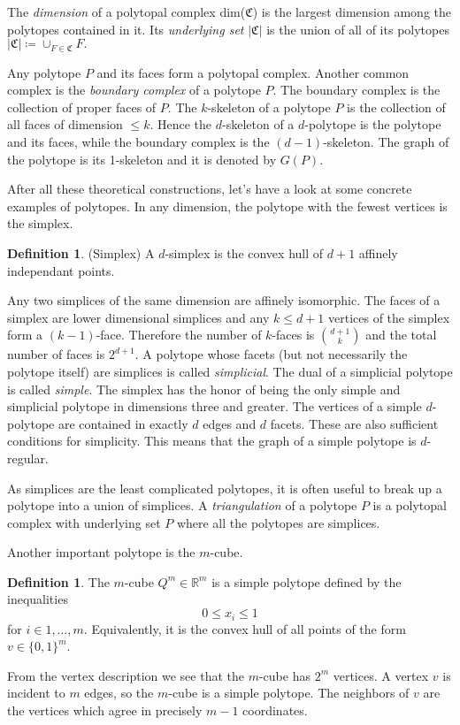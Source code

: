\documentclass[a4paper,12pt]{book}
\theoremstyle{plain}
\theoremstyle{definition}
\newtheorem{definition}[theorem]{Definition}
\begin{document}
The \emph{dimension} of a polytopal complex dim($\mathfrak{C}$) is the largest dimension
among the polytopes contained in it. Its \textit{underlying set} $|\mathfrak{C}|$ is the union of all of 
its polytopes $  |\mathfrak{C}| \coloneqq \cup_{F\in \mathfrak{C}} F.$

Any polytope $P$ and its faces form a polytopal complex. Another common complex is the 
\textit{boundary complex} of a polytope
$P$. The boundary complex is the collection of proper faces of $P$.
The $k$-skeleton of a polytope $P$ is the collection of all faces of dimension $\leq 
k$. Hence the $d$-skeleton of a $d$-polytope is the polytope and its faces, while the 
boundary complex is the $(d-1)$-skeleton. The graph of the polytope is its 
1-skeleton and it is denoted by $G(P)$.

After all these theoretical constructions, let's have a look at some concrete examples
of polytopes.
In any dimension, the polytope with the fewest vertices is the simplex. 
\begin{definition}
 (Simplex) A $d$-simplex is the convex hull of $d+1$ affinely independant 
points.
\end{definition}
Any two simplices of the same dimension are affinely isomorphic.
The faces of a simplex are lower dimensional simplices and any $k\le d+1$ vertices
of the simplex form a $(k-1)$-face. Therefore the number of $k$-faces is $\binom{d+1}{k}$
and the total number of faces is $2^{d+1}$.
 A polytope whose facets 
(but not necessarily the polytope itself) are simplices is called 
\textit{simplicial}. The dual of a simplicial polytope is called 
\textit{simple}. The simplex has the honor of being the only simple and simplicial polytope in dimensions three and greater.
The vertices of a simple $d$-polytope are contained in exactly 
$d$ edges and $d$ facets. These are also sufficient conditions for simplicity. This means that the graph of a simple polytope is $d$-regular.

As simplices are the least complicated polytopes, it is often useful to break up a polytope into
a union of simplices. A \emph{triangulation} of a polytope $P$ is a polytopal complex with underlying set
$P$ where all the polytopes are simplices.


Another important polytope is the $m$-cube.

\begin{definition}
 The $m$-cube $Q^m \in \mathbb{R}^m$ is a simple polytope defined by the inequalities
\begin{equation}
 0 \leq x_i \leq 1 
\end{equation}
for $i \in 1,\dots, m$. Equivalently, it is the convex hull of all points of the form $v \in \{0,1\}^m$.
\end{definition}
From the vertex description we see that the $m$-cube has $2^m$ vertices. A vertex $v$
is incident to $m$ edges, so the $m$-cube is a simple polytope. The neighbors of $v$ are
the vertices which agree in precisely $m-1$ coordinates.
\end{document}

